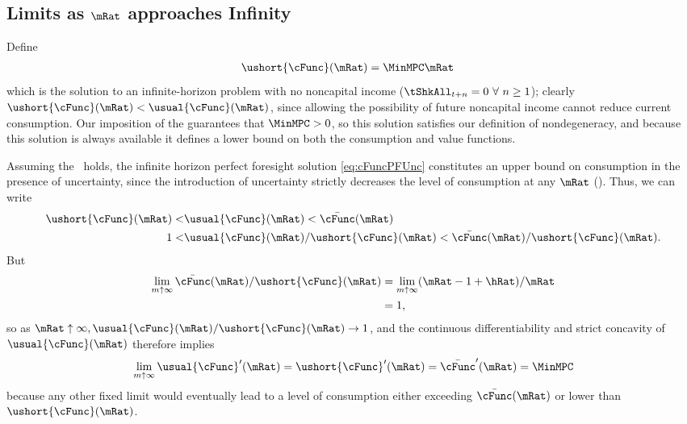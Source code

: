 \documentclass[BufferStockTheory]{subfiles}
\begin{document}
\renewcommand{\figFile}{cGroTargetFig}
\hypertarget{\figFile}{}


\hypertarget{LimitsAsmtToInfty}{}
\subsection{Limits as $\mRat$ approaches Infinity}

\label{subsec:LimitsAsmtToInfty}

Define
\begin{align*}
  \ushort{\cFunc}(\mRat)  & = \MinMPC \mRat
\end{align*}
which is the solution to an infinite-horizon problem with no noncapital income ($\tShkAll_{t+n} = 0~\forall~n\geq1$); clearly $\ushort{\cFunc}(\mRat) < \usual{\cFunc}(\mRat)$, since allowing the possibility of future noncapital income cannot reduce current consumption.  Our imposition of the {\RIC} guarantees that $\MinMPC > 0$, so this solution satisfies our definition of nondegeneracy, and because this solution is always available it defines a lower bound on both the consumption and value functions.%

Assuming the \FHWC~holds, the infinite horizon perfect foresight solution \eqref{eq:cFuncPFUnc} constitutes an upper bound on consumption in the presence of uncertainty, since the introduction of uncertainty strictly decreases the level of consumption at any $\mRat$ (\cite{ckConcavity}).  Thus, we can write
\begin{align}  
  \ushort{\cFunc}(\mRat) < & \usual{\cFunc}(\mRat)  < \bar{\cFunc}(\mRat) \label{eq:lowerltupper} \\
  1 < & \usual{\cFunc}(\mRat)/\ushort{\cFunc}(\mRat)  < \bar{\cFunc}(\mRat)/\ushort{\cFunc}(\mRat). \nonumber
\end{align}
But
\begin{align*}  \label{eq:limitlowerupper}
  \lim_{m \uparrow \infty} \bar{\cFunc}(\mRat)/\ushort{\cFunc}(\mRat) 
  & = \lim_{m \uparrow \infty} (\mRat -1+ \hRat)/\mRat  \\
  & = 1, 
\end{align*}
so as $\mRat \uparrow \infty, \usual{\cFunc}(\mRat)/\ushort{\cFunc}(\mRat)
\rightarrow 1$, and the continuous differentiability and strict
concavity of $\usual{\cFunc}(\mRat)$ therefore implies
\begin{equation*}  \label{eq:limxtoinftycp}
  \lim_{m \uparrow \infty} \usual{\cFunc}^{\prime}(\mRat) =
  \ushort{\cFunc}^{\prime}(\mRat) = \bar{\cFunc}^{\prime}(\mRat) = \MinMPC 
\end{equation*}
because any other fixed limit would eventually lead to a level of
consumption either exceeding $\bar{\cFunc}(\mRat)$ or lower than
$\ushort{\cFunc}(\mRat)$.
\end{document}
